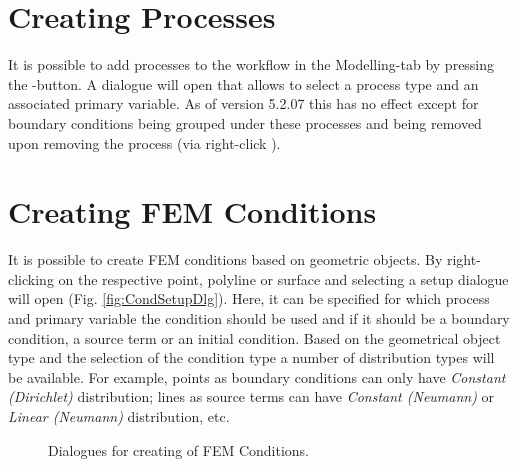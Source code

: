 \section{Creating Processes}

It is possible to add processes to the workflow in the Modelling-tab by pressing the -button. A dialogue will open that allows to select a process type and an associated primary variable. As of version 5.2.07 this has no effect except for boundary conditions being grouped under these processes and being removed upon removing the process (via right-click ).

\section{Creating FEM Conditions}

It is possible to create FEM conditions based on geometric objects. By right-clicking on the respective point, polyline or surface and selecting  a setup dialogue will open (Fig. \ref{fig:CondSetupDlg}). Here, it can be specified for which process and primary variable the condition should be used and if it should be a boundary condition, a source term or an initial condition. Based on the geometrical object type and the selection of the condition type a number of distribution types will be available. For example, points as boundary conditions can only have \emph{Constant (Dirichlet)} distribution; lines as source terms can have \emph{Constant (Neumann)} or \emph{Linear (Neumann)} distribution, etc.

\begin{figure}[tb]
\begin{center}
\enspace
{}\enspace
{}
\end{center}
\caption{Dialogues for creating of FEM Conditions.} \label{fig:CondSetup}
\end{figure}

